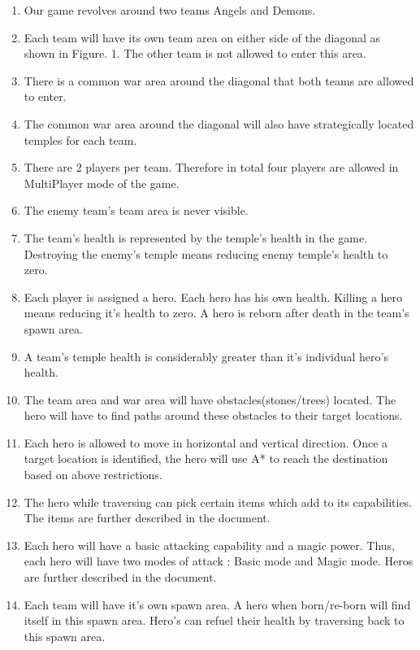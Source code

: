 \begin{enumerate}
\item Our game revolves around two teams Angels and Demons.

\item Each team will have its own team area on either side of the diagonal as shown in Figure. 1. The other team is not allowed to enter this area.

\item There is a common war area around the diagonal that both teams are allowed to enter.

\item The common war area around the diagonal will also have strategically located temples for each team.

\item There are 2 players per team. Therefore in total four players are allowed in MultiPlayer mode of the game.

\item The enemy team's team area is never visible.

\item The team's health is represented by the temple's health in the game. Destroying the enemy's temple means reducing enemy temple's health to zero.

\item Each player is assigned a hero. Each hero has his own health. Killing a hero means reducing it's health to zero. A hero is reborn after death in the team’s spawn area.

\item A team's temple health is considerably greater than it's individual hero's health.

\item The team area and war area will have obstacles(stones/trees) located. The hero will have to find paths around these obstacles to their target locations.

\item Each hero is allowed to move in horizontal and vertical direction. Once a target location is identified, the hero will use A* to reach the destination based on above restrictions.

\item The hero while traversing can pick certain items which add to its capabilities. The items are further described in the document.

\item Each hero will have a basic attacking capability and a magic power. Thus, each hero will have two modes of attack : Basic mode and Magic mode. Heros are further described in the document.

\item Each team will have it's own spawn area. A hero when born/re-born will find itself in this spawn area. Hero's can refuel their health by traversing back to this spawn area.
\end{enumerate}


